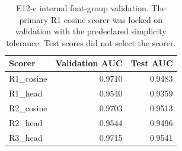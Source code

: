 \begin{table}[t]
\centering\small
\caption{E12-c internal font-group validation. The primary R1 cosine scorer was locked on validation with the predeclared simplicity tolerance. Test scores did not select the scorer.}
\begin{tabular}{lrr}
\toprule
Scorer & Validation AUC & Test AUC \\
\midrule
R1\_cosine & 0.9710 & 0.9483 \\
R1\_head & 0.9540 & 0.9359 \\
R2\_cosine & 0.9703 & 0.9513 \\
R2\_head & 0.9544 & 0.9496 \\
R3\_head & 0.9715 & 0.9541 \\
\bottomrule
\end{tabular}
\end{table}
